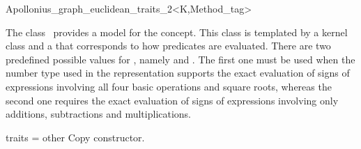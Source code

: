 

\begin{ccRefClass}{Apollonius_graph_euclidean_traits_2<K,Method_tag>}

\ccDefinition
  
The class \ccRefName\ provides a model for the
 concept.
This class is templated by a kernel class  and a
 that corresponds to how predicates are
evaluated. There are two predefined 
possible values for , namely  and
. The first one must be used when the number
type used in the representation supports the exact evaluation of signs
of expressions involving all four basic operations and 
square roots, whereas the second one requires the exact evaluation of
signs of expressions involving only additions, subtractions and
multiplications. 


\ccIsModel
{}

\ccCreation
{}
{traits = other}{}
\ccThreeToTwo
%
\ccGlue
{}
{Copy constructor.}
\ccGlue
{}


\ccSeeAlso
{} \\


\end{ccRefClass}


